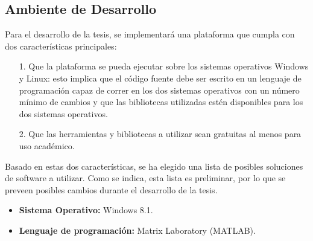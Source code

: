 \subsection{Ambiente de Desarrollo}
Para el desarrollo de la tesis, se implementar\'a una plataforma que cumpla con dos caracter\'isticas principales:
\begin{itemize}
\item [1.] Que la plataforma se pueda ejecutar sobre los sistemas operativos Windows y Linux: esto implica que el c\'odigo fuente debe ser escrito en un lenguaje de programaci\'on capaz de correr en los dos sistemas operativos con un n\'umero m\'inimo de cambios y que las bibliotecas utilizadas est\'en disponibles para los dos sistemas operativos.
\item [2.] Que las herramientas y bibliotecas a utilizar sean gratuitas al menos para uso acad\'emico.
\end{itemize}
Basado en estas dos caracter\'isticas, se ha elegido una lista de posibles soluciones de software a utilizar. Como se indica, esta lista es preliminar, por lo que se preveen posibles cambios durante el desarrollo de la tesis.
\begin{itemize}
\item \textbf{Sistema Operativo:} Windows 8.1.
\item \textbf{Lenguaje de programaci\'on:} Matrix Laboratory (MATLAB).
\end{itemize}
